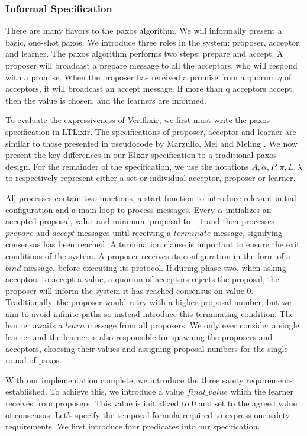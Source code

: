 \subsubsection{Informal Specification}
There are many flavors to the paxos algorithm. We will informally present a basic, one-shot paxos. We introduce three roles in the system: proposer, acceptor and learner. The paxos algorithm performs two steps: prepare and accept. A proposer will broadcast a prepare message to all the acceptors, who will respond with a promise. When the proposer has received a promise from a quorum $q$ of acceptors, it will broadcast an accept message. If more than q acceptors accept, then the value is chosen, and the learners are informed.
\par
To evaluate the expressiveness of Veriflixir, we first must write the paxos specification in LTLixir. The specifications of proposer, acceptor and learner are similar to those presented in pseudocode by Marzullo, Mei and Meling \cite{paxos_pseudocode}. We now present the key differences in our Elixir specification to a traditional paxos design. For the remainder of the specification, we use the notations $A, \alpha, P, \pi, L, \lambda$ to respectively represent either a set or individual acceptor, proposer or learner.
\par
All processes contain two functions, a start function to introduce relevant initial configuration and a main loop to process messages. Every $\alpha$ initializes an accepted proposal, value and minimum proposal to $-1$ and then processes $prepare$ and $accept$ messages until receiving a $terminate$ message, signifying consensus has been reached. A termination clause is important to ensure the exit conditions of the system. A proposer receives its configuration in the form of a $bind$ message, before executing its protocol. If during phase two, when asking acceptors to accept a value, a quorum of acceptors rejects the proposal, the proposer will inform the system it has reached consensus on value $0$. Traditionally, the proposer would retry with a higher proposal number, but we aim to avoid infinite paths so instead introduce this terminating condition. The learner awaits a $learn$ message from all proposers. We only ever consider a single learner and the learner is also responsible for spawning the proposers and acceptors, choosing their values and assigning proposal numbers for the single round of paxos.
\par
With our implementation complete, we introduce the three safety requirements established. To achieve this, we introduce a value $final\_value$ which the learner receives from proposers. This value is initialized to $0$ and set to the agreed value of consensus. Let's specify the temporal formula required to express our safety requirements. We first introduce four predicates into our specification.
